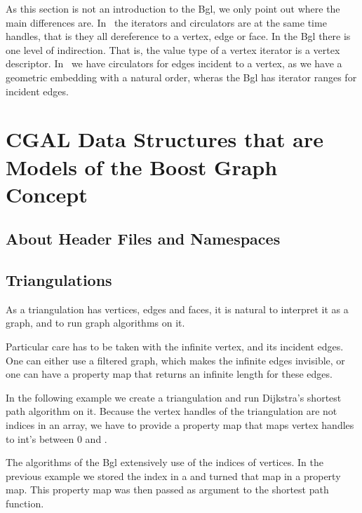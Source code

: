 As this section is not an introduction to the {\sc Bgl}, we only point
out where the main differences are. In \cgal\ the iterators and
circulators are at the same time handles, that is they all dereference
to a vertex, edge or face. In the {\sc Bgl} there is one level of
indirection. That is, the value type of a vertex iterator is a vertex
descriptor.  In \cgal\ we have circulators for edges incident to a
vertex, as we have a geometric embedding with a natural order, wheras
the {\sc Bgl} has iterator ranges for incident edges.




\section{CGAL Data Structures that are Models of the Boost Graph Concept}

\subsection{About Header Files and Namespaces}


\subsection{Triangulations}

As a triangulation has vertices, edges and faces, it is natural to interpret it as a graph,
and to run graph algorithms on it.  


Particular care has to be taken with the infinite vertex, and its incident
edges. One can either use a filtered graph, which makes the infinite edges
invisible, or one can have a property map that returns an infinite length
for these edges.




In the following example we create a triangulation and run Dijkstra's shortest path
algorithm on it. Because the vertex handles of the triangulation are not indices
in an array, we have to provide a property map that maps vertex handles to
int's between 0 and .




The algorithms of the {\sc Bgl} extensively use of the indices of
vertices. In the previous example we stored the index in a 
and turned that map in a property map. This property map was then
passed as argument to the shortest path function.

